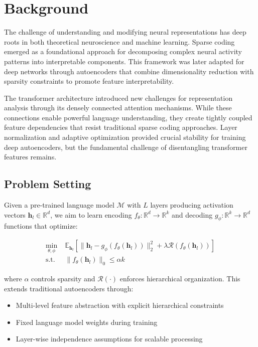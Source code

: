 \documentclass{article} %
\begin{document}
\section{Background}
\label{sec:background}

The challenge of understanding and modifying neural representations has deep roots in both theoretical neuroscience and machine learning. Sparse coding \cite{goodfellow2016deep} emerged as a foundational approach for decomposing complex neural activity patterns into interpretable components. This framework was later adapted for deep networks through autoencoders that combine dimensionality reduction with sparsity constraints to promote feature interpretability.

The transformer architecture \cite{vaswani2017attention} introduced new challenges for representation analysis through its densely connected attention mechanisms. While these connections enable powerful language understanding, they create tightly coupled feature dependencies that resist traditional sparse coding approaches. Layer normalization \cite{ba2016layer} and adaptive optimization \cite{kingma2014adam} provided crucial stability for training deep autoencoders, but the fundamental challenge of disentangling transformer features remains.

\subsection{Problem Setting}
Given a pre-trained language model $\mathcal{M}$ with $L$ layers producing activation vectors $\mathbf{h}_l \in \mathbb{R}^d$, we aim to learn encoding $f_\theta: \mathbb{R}^d \rightarrow \mathbb{R}^k$ and decoding $g_\phi: \mathbb{R}^k \rightarrow \mathbb{R}^d$ functions that optimize:

\begin{align*}
    \min_{\theta,\phi} & \;\mathbb{E}_{\mathbf{h}_l}\left[\|\mathbf{h}_l - g_\phi(f_\theta(\mathbf{h}_l))\|_2^2 + \lambda\mathcal{R}(f_\theta(\mathbf{h}_l))\right] \\
    \text{s.t.} & \;\|f_\theta(\mathbf{h}_l)\|_0 \leq \alpha k
\end{align*}

where $\alpha$ controls sparsity and $\mathcal{R}(\cdot)$ enforces hierarchical organization. This extends traditional autoencoders through:

\begin{itemize}
    \item Multi-level feature abstraction with explicit hierarchical constraints
    \item Fixed language model weights during training
    \item Layer-wise independence assumptions for scalable processing
\end{itemize}
\end{document}
